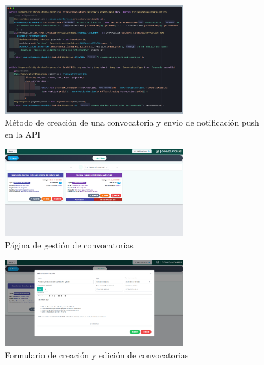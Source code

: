 \begin{figure}[H]
    \centering
    \includegraphics[width=0.7\textwidth]{resources/images/api-convocation-create-usecase}
    \caption{Método de creación de una convocatoria y envio de notificación push en la API}
    \label{fig:api-convocation-create}
\end{figure}

\begin{figure}[H]
    \centering
    \includegraphics[width=0.7\textwidth]{resources/images/sw-convocatorias}
    \caption{Página de gestión de convocatorias}
    \label{fig:sw-convocatorias}
\end{figure}

\begin{figure}[H]
    \centering
    \includegraphics[width=0.7\textwidth]{resources/images/sw-convocatorias-form}
    \caption{Formulario de creación y edición de convocatorias}
    \label{fig:sw-convocatorias-formulario}
\end{figure}

